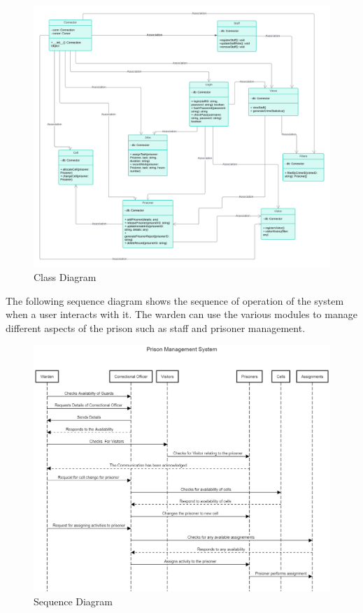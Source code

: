     \begin{figure}[H]
        \centering
        \includegraphics[angle=90, width=\textwidth, height=\textheight, keepaspectratio]{class3.png}
        \caption{Class Diagram}
        \label{fig:class}
    \end{figure}
    \newpage
    The following sequence diagram shows the sequence of operation of the system when a user interacts with it. The warden can use the various modules to manage different aspects of the prison such as staff and prisoner management.
    \begin{figure}[H]
        \centering
        \includegraphics[scale=0.45, width=\textwidth]{sequence.png}
        \caption{Sequence Diagram}
        \label{fig:sequence}
    \end{figure}
